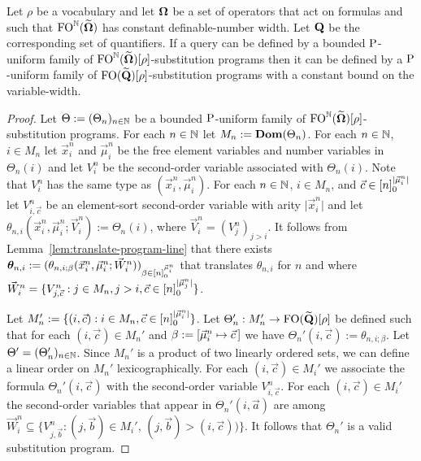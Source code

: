 \documentclass[../main/thesis.tex]{subfiles}
\begin{document}
\begin{lem}
  Let $\rho$ be a vocabulary and let $\mathbf{\mathbf{\Omega}}$ be a set of operators that act on
  formulas and such that $\text{\upshape FO}^{\mathbb{N}} (\widetilde{\mathbf{\mathbf{\Omega}}})$ has constant
  definable-number width. Let $\mathbf{Q}$ be the corresponding set of
  quantifiers. If a query can be defined by a bounded $\mathrm{P}$-uniform family of
  $\text{\upshape FO}^{\mathbb{N}} (\widetilde{\mathbf{\mathbf{\Omega}}})[\rho]$-substitution programs then it can be
  defined by a $\mathrm{P}$-uniform family of
  $\text{\upshape FO} (\widetilde{\mathbf{Q}})[\rho]$-substitution programs with a constant bound
  on the variable-width.
  \label{lem:translate-sub-operators-to-queries}
\end{lem}
\begin{proof}
  Let $\Theta := (\Theta_{n})_{n \in \mathbb{N}}$ be a bounded $\mathrm{P}$-uniform family
  of $\text{\upshape FO}^{\mathbb{N}} (\widetilde{\mathbf{\mathbf{\Omega}}})[\rho]$-substitution programs. For each $n
  \in \mathbb{N}$ let $M_n := \text{\textbf{Dom}}(\Theta_n)$. For each $n \in \mathbb{N}$, $i \in M_n$
  let $\vec{x}^n_i$ and $\vec{\mu}^n_i$ be the free element variables and number
  variables in $\Theta_n(i)$ and let $V^n_i$ be the second-order variable
  associated with $\Theta_n(i)$. Note that $V^n_i$ has the same type as
  $(\vec{x}^n_i, \vec{\mu}^n_i)$. For each $n \in \mathbb{N}$, $i \in M_n$, and
  $\vec{c} \in [n]^{\vert \vec{\mu}^n_i \vert}_0$ let $V^n_{i, \vec{c}}$
  be an element-sort second-order variable with arity $\vert \vec{x}^n_i\vert$
  and let $\theta_{n, i}(\vec{x}^n_i, \vec{\mu}^n_i; \vec{V}^n_i) :=
  \Theta_n(i)$, where $\vec{V}^n_i = (V^n_j)_{j > i}$. It follows from
  Lemma~\ref{lem:translate-program-line} that there exists
  $\boldsymbol{\theta}_{n, i} := (\theta_{n, i; \beta} (\vec{x}^n_i
  ,\vec{\mu}^n_i ; \vec{W}^n_{i}))_{\beta \in [n]^{\vec{\mu}^n_i}_0}$
  that translates $\theta_{n, i}$ for $n$ and where $\vec{W}^n_i = \{V^{n}_{j,
    \vec{c}} : j \in M_n, j > i, \vec{c} \in [n]^{\vert \vec{\mu}^n_j
    \vert}_0\}$.


  Let $M_n' := \{(i, \vec{c}) : i \in M_n, \vec{c} \in [n]^{\vert
    \vec{\mu}^n_i \vert}_0\}$. Let $\Theta_n' : M_n' \rightarrow
  \text{\upshape FO} (\widetilde{\mathbf{Q}})[\rho]$ be defined such that for each $(i, \vec{c})
  \in M_n'$ and $\beta := [\vec{\mu}^n_i \mapsto \vec{c} \,]$ we have $\Theta_n'
  (i, \vec{c}) := \theta_{n, i; \beta}$. Let $\Theta' = (\Theta_n')_{n \in
    \mathbb{N}}$. Since $M_n'$ is a product of two linearly ordered sets, we can
  define a linear order on $M_n'$ lexicographically. For each $(i, \vec{c})\in
  M_i'$ we associate the formula $\Theta_n'(i, \vec{c})$ with the second-order
  variable $V^n_{i, \vec{c}}$. For each $(i, \vec{c})\in M_i'$ the second-order
  variables that appear in $\Theta_n'(i, \vec{a})$ are among $\vec{W}^n_i
  \subseteq \{V^n_{j, \vec{b}} : (j, \vec{b}) \in M_i', \, (j, \vec{b}) > (i,
  \vec{c}))\}$. It follows that $\Theta_n'$ is a valid substitution program.


\end{proof}
\end{document}
